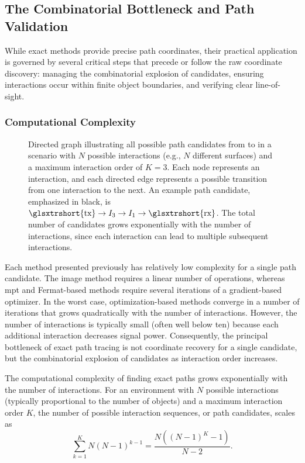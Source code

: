 \subsection{The Combinatorial Bottleneck and Path Validation}

While exact methods provide precise path coordinates, their practical application is governed by several critical steps that precede or follow the raw coordinate discovery: managing the combinatorial explosion of candidates, ensuring interactions occur within finite object boundaries, and verifying clear \gls{line-of-sight}.

\subsubsection{Computational Complexity}

\begin{figure}
  \centering
  \caption{Directed graph illustrating all possible path candidates from  to  in a scenario with $N$ possible interactions (e.g., $N$ different surfaces) and a maximum interaction order of $K=3$. Each node represents an interaction, and each directed edge represents a possible transition from one interaction to the next. An example path candidate, emphasized in black, is $\text{\glsxtrshort{tx}}\to I_3 \to I_1 \to \text{\glsxtrshort{rx}}$. The total number of candidates grows exponentially with the number of interactions, since each interaction can lead to multiple subsequent interactions.}
\end{figure}

Each method presented previously has relatively low complexity for a single path candidate. The image method requires a linear number of operations, whereas \gls{mpt} and Fermat-based methods require several iterations of a gradient-based optimizer. In the worst case, optimization-based methods converge in a number of iterations that grows quadratically with the number of interactions. However, the number of interactions is typically small (often well below ten) because each additional interaction decreases signal power. Consequently, the principal bottleneck of exact path tracing is not coordinate recovery for a single candidate, but the combinatorial explosion of candidates as interaction order increases.

The computational complexity of finding exact paths grows exponentially with the number of interactions. For an environment with $N$ possible interactions (typically proportional to the number of objects) and a maximum interaction order $K$, the number of possible interaction sequences, or path candidates, scales as
\begin{equation}
  \sum_{k=1}^{K} N\left(N-1\right)^{k-1} = \frac{N \left(\left(N-1\right)^K-1\right)}{N - 2}.
\end{equation}

